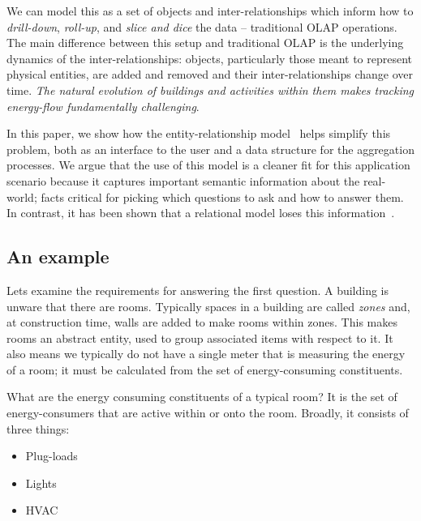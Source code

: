 We can model this as a set of objects and inter-relationships which inform how
to \emph{drill-down}, \emph{roll-up}, and \emph{slice and dice} the data -- traditional OLAP operations.
The main difference between this setup and traditional OLAP is the underlying dynamics of the
inter-relationships: objects, particularly those meant to represent physical entities, are added and removed and 
their inter-relationships change over time.  \emph{The natural evolution of buildings and activities 
within them makes tracking energy-flow fundamentally challenging}.

In this paper, we show how the entity-relationship model~\cite{Chen76theentity-relationship} helps simplify 
this problem, both as an interface
to the user and a data structure for the aggregation processes.  We argue that the use of this model is a cleaner
fit for this application scenario because it captures important semantic information about the real-world;
facts critical for picking which questions to ask and how to answer them.  In contrast, it has been shown 
that a relational model loses this information~\cite{SenkoDB}.














\subsection{An example}
Lets examine the requirements for answering the first question.
A building is unware that there are rooms. Typically spaces in a building are called \emph{zones} and, 
at construction time, walls are added to make rooms within zones.  This makes rooms an abstract
entity, used to group associated items with respect to it.  It also means
we typically do not have a single meter that is measuring the energy of a room; it
must be calculated from the set of energy-consuming constituents.

What are the energy consuming constituents of a typical room?  It is the set of energy-consumers that
are active within or onto the room.  Broadly, it consists of three things:

\begin{itemize}
\item Plug-loads
\item Lights
\item HVAC
\end{itemize}
\vspace{0.08in}

